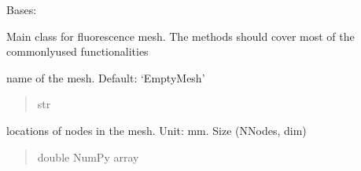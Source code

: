 \documentclass[letterpaper,10pt,english]{sphinxmanual}
\begin{document}
\begin{fulllineitems}
\label{\detokenize{_autosummary/nirfasterff.base.fluor_mesh.fluormesh:nirfasterff.base.fluor_mesh.fluormesh}}
\pysigstartsignatures
{}
\pysigstopsignatures
\sphinxAtStartPar
Bases: 

\sphinxAtStartPar
Main class for fluorescence mesh. The methods should cover most of the commonly\sphinxhyphen{}used functionalities

\begin{fulllineitems}
\label{\detokenize{_autosummary/nirfasterff.base.fluor_mesh.fluormesh:nirfasterff.base.fluor_mesh.fluormesh.name}}
\pysigstartsignatures
{}
\pysigstopsignatures
\sphinxAtStartPar
name of the mesh. Default: ‘EmptyMesh’
\begin{quote}\begin{description}
\sphinxAtStartPar
str

\end{description}\end{quote}

\end{fulllineitems}


\begin{fulllineitems}
\label{\detokenize{_autosummary/nirfasterff.base.fluor_mesh.fluormesh:nirfasterff.base.fluor_mesh.fluormesh.nodes}}
\pysigstartsignatures
{}
\pysigstopsignatures
\sphinxAtStartPar
locations of nodes in the mesh. Unit: mm. Size (NNodes, dim)
\begin{quote}\begin{description}
\sphinxAtStartPar
double NumPy array

\end{description}\end{quote}

\end{fulllineitems}


\end{fulllineitems}
\end{document}
